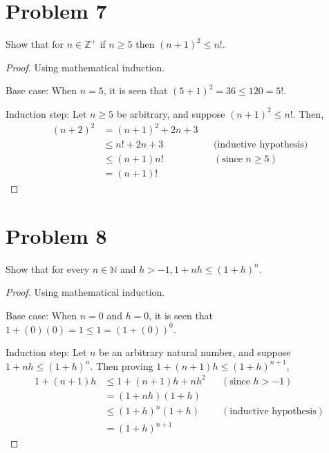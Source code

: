 \documentclass{article}
\begin{document}

    \section*{Problem 7}

    Show that for $n\in\mathbb{Z}^+$ if $n\geq 5$ then $(n+1)^2\leq n!$.

    \begin{proof}
        Using mathematical induction.

        Base case: When $n=5$, it is seen that $(5+1)^2=36\leq 120=5!$.

        Induction step: Let $n\geq 5$ be arbitrary, and suppose $(n+1)^2\leq n!$.
        Then,
        \begin{align*}
            (n+2)^2 & = (n+1)^2+2n+3 \\
            & \leq n!+2n+3 && \text{(inductive hypothesis)} \\
            & \leq (n+1)n! && (\text{since }n\geq 5) \\
            & = (n+1)!
        \end{align*}
    \end{proof}
    

    \section*{Problem 8}

    Show that for every $n\in\mathbb{N}$ and $h>-1, 1+nh\leq(1+h)^n$.
    
    \begin{proof}
        Using mathematical induction.

        Base case: When $n=0$ and $h=0$, it is seen that $1+(0)(0)=1\leq 1 =(1+(0))^0$.

        Induction step: Let $n$ be an arbitrary natural number, and
        suppose $1+nh\leq (1+h)^n$. 
        Then proving $1+(n+1)h\leq (1+h)^{n+1}$,
        \begin{align*}
            1+(n+1)h & \leq 1+(n+1)h+nh^2 && (\text{since } h>-1)\\
            & = (1+nh)(1+h) \\
            & \leq (1+h)^n(1+h) && (\text{inductive hypothesis})\\
            & = (1+h)^{n+1}
        \end{align*}
    \end{proof}
\end{document}
